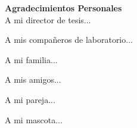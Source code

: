 \newpage
    \begin{center}
        {\large \textbf{Agradecimientos Personales}}\\[0.3cm]
        A mi director de tesis...

        A mis compañeros de laboratorio...

        A mi familia...

        A mis amigos...

        A mi pareja...

        A mi mascota...

    \end{center}